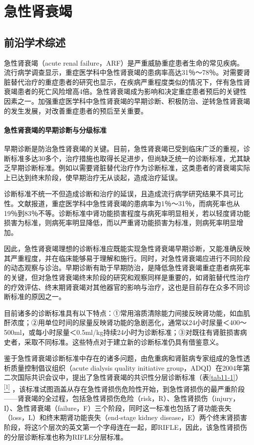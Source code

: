 \chapter{急性肾衰竭}

\section{前沿学术综述}

急性肾衰竭（acute renal
failure，ARF）是严重威胁重症患者生命的常见疾病。流行病学调查显示，重症医学科中急性肾衰竭的患病率高达31％～78％。对需要肾脏替代治疗的重症患者的研究也显示，在疾病严重程度类似的情况下，伴有急性肾衰竭患者的死亡风险增高4倍。急性肾衰竭成为影响和决定重症患者预后的关键性因素之一。加强重症医学科中急性肾衰竭的早期诊断、积极防治、逆转急性肾衰竭的发生发展，对改善重症患者的预后至关重要。

\subsubsection{急性肾衰竭的早期诊断与分级标准}

早期诊断是防治急性肾衰竭的关键。目前，急性肾衰竭已受到临床广泛的重视，诊断标准多达30多个，治疗措施也取得长足进步，但尚缺乏统一的诊断标准，尤其缺乏早期诊断标准。例如以需要肾脏替代治疗作为诊断标准，这类患者的肾衰竭实际上已达到终末阶段，使早期治疗无从谈起，造成治疗延误。

诊断标准不统一不但造成诊断和治疗的延误，且造成流行病学研究结果不具可比性。文献报道，重症医学科中急性肾衰竭的患病率为1％～31％，而病死率也从19％到83％不等。诊断标准中肾功能损害程度与病死率明显相关，若以轻度肾功能损害为标准，则病死率明显降低，而以严重肾功能损害为标准，则病死率明显增加。

因此，急性肾衰竭理想的诊断标准应既能实现急性肾衰竭早期诊断，又能准确反映其严重程度，并在临床能够易于理解和施行。同时，对急性肾衰竭应进行不同阶段的动态观察与诊治。早期诊断有助于早期防治，是降低急性肾衰竭重症患者病死率的关键，但对急性肾衰竭终末阶段的研究和观察同样是重要的，如肾脏替代性治疗的疗效评估、终末期肾衰竭对其他器官的影响与治疗，这也是目前存在众多不同诊断标准的原因之一。

目前诸多的诊断标准具有以下特点：①常用溶质清除能力间接反映肾功能，如血肌酐浓度；②用单位时间的尿量反映肾功能的急剧恶化，通常以24小时尿量＜400～500ml，或每小时尿量＜0.5ml/kg持续24小时为诊断标准；③对既往有肾脏损害病史者，采取不同标准。这些特点对于建立新的诊断标准仍具有借鉴意义。

鉴于急性肾衰竭诊断标准中存在的诸多问题，由危重病和肾脏病专家组成的急性透析质量控制倡议组织（acute
dialysis quality initiative
group，ADQI）在2004年第二次国际共识会议中，提出了急性肾衰竭的共识性分层诊断标准（表\ref{tab11-1}）
\protect\hyperlink{text00017.htmlux5cux23ch1-16}{\textsuperscript{{[}1{]}}}
，该标准试图涵盖从存在急性肾损伤危险性开始，到急性肾损伤的最严重阶段------肾衰竭的全过程，包括急性肾损伤危险（risk，R）、急性肾损伤（injury，I）、急性肾衰竭（failure，F）三个阶段，同时这一标准也包括了肾功能丧失（loss，L）和终末期肾功能丧失（end-stage
kidney
disease，E）两个终末肾损害阶段，将这5个层次的英文第一个字母连在一起，即RIFLE，因此，该急性肾损伤的分层诊断标准也称为RIFLE分层标准。

